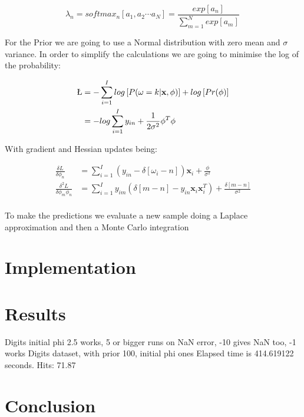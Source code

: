 \documentclass[12pt]{article}
\begin{document}
\begin{equation}
\label{softmax}
\lambda_{n} = softmax_{n}[a_{1}, a_{2} \cdots a_{N}] = 
\frac{exp[a_{n}]} {\sum_{m = 1}^{N} exp[a_{m}] }\,
\end{equation}

For the Prior we are going to use a Normal distribution with zero mean and $\sigma$ variance.
In order to simplify the calculations we are going to minimise the log of the probability:

\begin{align}
\label{L}
\L &= - \sum_{i = 1}^{I} log \left[ P(\omega = k | \mathbf{x}, \phi) \right]  + log \left[ Pr(\phi) \right] \nonumber \\
&= - log \sum_{i = 1}^{I} y_{in} + \frac{1}{2 \sigma^{2}} \phi^{T} \phi 
\end{align}

With gradient and Hessian updates being:

\begin{align}
\label{L}
\frac{\delta L}{ \delta \phi_{n}} &= \sum_{i = 1}^{I} \left( y_{in} - \delta \left[ \omega_{i} - n \right] \right) \mathbf{x}_{i}  + \frac{\phi} {\sigma^{2}} \nonumber \\
\frac{\delta^{2} L}{ \delta \phi_{m}\phi_{n}} &= \sum_{i = 1}^{I} y_{im} \left( \delta \left[ m - n \right] - y_{in} \mathbf{x}_{i} \mathbf{x}_{i}^{T}  \right) +  \frac{\delta \left[ m - n \right]}{\sigma^{2}} \nonumber \\
\end{align}

To make the predictions we evaluate a new sample doing a Laplace approximation and then a Monte Carlo integration
 
\section{Implementation}


\section{Results}

Digits initial phi 2.5 works, 5 or bigger runs on NaN error,  -10 gives NaN too, -1 works
Digits dataset, with prior 100, initial phi ones
Elapsed time is 414.619122 seconds.
Hits: 71.87%

\section{Conclusion}


 
\end{document}
